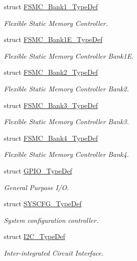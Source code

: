 \begin{DoxyCompactItemize}
struct \hyperlink{struct_f_s_m_c___bank1___type_def}{F\-S\-M\-C\-\_\-\-Bank1\-\_\-\-Type\-Def}
\begin{DoxyCompactList}\small\item\em Flexible Static Memory Controller. \end{DoxyCompactList}\item 
struct \hyperlink{struct_f_s_m_c___bank1_e___type_def}{F\-S\-M\-C\-\_\-\-Bank1\-E\-\_\-\-Type\-Def}
\begin{DoxyCompactList}\small\item\em Flexible Static Memory Controller Bank1\-E. \end{DoxyCompactList}\item 
struct \hyperlink{struct_f_s_m_c___bank2___type_def}{F\-S\-M\-C\-\_\-\-Bank2\-\_\-\-Type\-Def}
\begin{DoxyCompactList}\small\item\em Flexible Static Memory Controller Bank2. \end{DoxyCompactList}\item 
struct \hyperlink{struct_f_s_m_c___bank3___type_def}{F\-S\-M\-C\-\_\-\-Bank3\-\_\-\-Type\-Def}
\begin{DoxyCompactList}\small\item\em Flexible Static Memory Controller Bank3. \end{DoxyCompactList}\item 
struct \hyperlink{struct_f_s_m_c___bank4___type_def}{F\-S\-M\-C\-\_\-\-Bank4\-\_\-\-Type\-Def}
\begin{DoxyCompactList}\small\item\em Flexible Static Memory Controller Bank4. \end{DoxyCompactList}\item 
struct \hyperlink{struct_g_p_i_o___type_def}{G\-P\-I\-O\-\_\-\-Type\-Def}
\begin{DoxyCompactList}\small\item\em General Purpose I/\-O. \end{DoxyCompactList}\item 
struct \hyperlink{struct_s_y_s_c_f_g___type_def}{S\-Y\-S\-C\-F\-G\-\_\-\-Type\-Def}
\begin{DoxyCompactList}\small\item\em System configuration controller. \end{DoxyCompactList}\item 
struct \hyperlink{struct_i2_c___type_def}{I2\-C\-\_\-\-Type\-Def}
\begin{DoxyCompactList}\small\item\em Inter-\/integrated Circuit Interface. \end{DoxyCompactList}\item 

\end{DoxyCompactItemize}
